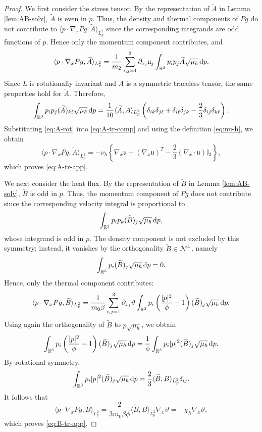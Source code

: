 \documentclass[10pt,reqno]{amsart}
\numberwithin{equation}{section}
\newcommand{\lt}{\left}
\newcommand{\rt}{\right}
\newcommand{\lal}{\langle}
\newcommand{\ral}{\rangle}
\newcommand{\mR}{\mathbb{R}}
\newcommand{\vth}{\vartheta}
\newcommand{\mfu}{\mathfrak{u}}
\newcommand{\intr}{\int_{\mR^3}}
\newcommand{\bq}{\begin{equation}}
\newcommand{\eq}{\end{equation}}
\newcommand{\calN}{\mathcal N}
\newcommand{\rdp}{\textnormal{d}p}
\begin{document}
\begin{proof}
We first consider the stress tensor. By the representation of $\widetilde A$ in Lemma \ref{lem:AB-solv}, $\widetilde A$ is even in $p$. Thus, the density and thermal components of $Pg$ do not contribute to $\lal p\cdot\nabla_xPg,\widetilde A\ral_{L^2_p}$ since the corresponding integrands are odd functions of $p$. Hence only the momentum component contributes, and
\bq\label{eq:A-tr-comp}
\lal p\cdot\nabla_xP g,\widetilde A \ral_{L^2_p}=\frac{1}{m_2 }\sum_{i,j=1}^3\partial_{x_i}\mfu_j\intr p_ip_j\widetilde A \sqrt{\mu_\hbar}\,\rdp.
\eq
Since $L $ is rotationally invariant and $A $ is a symmetric traceless tensor, the same properties hold for $\widetilde A $. Therefore,
\bq\label{eq:A-rot}
\intr p_ip_j(\widetilde A )_{k\ell}\sqrt{\mu_\hbar}\,\rdp=\frac{1}{10}\lal\widetilde A ,A \ral_{L^2_p}\lt(\delta_{ik}\delta_{j\ell}+\delta_{i\ell}\delta_{jk}-\frac{2}{3}\delta_{ij}\delta_{k\ell}\rt).
\eq
Substituting \eqref{eq:A-rot} into \eqref{eq:A-tr-comp} and using the definition \eqref{eq:nu-h}, we obtain
\[
\lal p\cdot\nabla_xP g,\widetilde A \ral_{L^2_p}=-\nu_\hbar\lt\{\nabla_x\mfu+(\nabla_x\mfu)^T-\frac{2}{3}(\nabla_x\cdot\mfu) \mathbb I_3\rt\},
\]
which proves \eqref{eq:A-tr-app}.

We next consider the heat flux. By the representation of $\widetilde B$ in Lemma \ref{lem:AB-solv}, $\widetilde B$ is odd in $p$. Thus, the momentum component of $Pg$ does not contribute since the corresponding velocity integral is proportional to
\[
\intr p_i p_k(\widetilde B)_j\sqrt{\mu_\hbar}\,\rdp,
\]
whose integrand is odd in $p$. The density component is not excluded by this symmetry; instead, it vanishes by the orthogonality $\widetilde B\in\calN^\perp$, namely
\[
\intr p_i(\widetilde B )_j\sqrt{\mu_\hbar}\,\rdp=0.
\]
Hence, only the thermal component contributes:
\[
\lal p\cdot\nabla_xP g,\widetilde B \ral_{L^2_p}=\frac{1}{m_0\beta}\sum_{i,j=1}^3\partial_{x_i}\vth\intr p_i\lt(\frac{|p|^2}{\phi }-1\rt)(\widetilde B )_j\sqrt{\mu_\hbar}\,\rdp.
\]
Using again the orthogonality of $\widetilde B $ to $p\sqrt{\mu_\hbar}$, we obtain
\[
\intr p_i\lt(\frac{|p|^2}{\phi }-1\rt)(\widetilde B )_j\sqrt{\mu_\hbar}\,\rdp=\frac{1}{\phi }\intr p_i|p|^2(\widetilde B )_j\sqrt{\mu_\hbar}\,\rdp.
\]
By rotational symmetry,
\[
\intr p_i|p|^2(\widetilde B )_j\sqrt{\mu_\hbar}\,\rdp=\frac{2}{3}\lal\widetilde B ,B \ral_{L^2_p}\delta_{ij}.
\]
It follows that
\[
\lal p\cdot\nabla_xP g,\widetilde B \ral_{L^2_p}=\frac{2}{3m_0\beta\phi }\lal\widetilde B ,B \ral_{L^2_p}\nabla_x\vth=-\chi_\hbar\nabla_x\vth,
\]
which proves \eqref{eq:B-tr-app}.
\end{proof}
\end{document}
